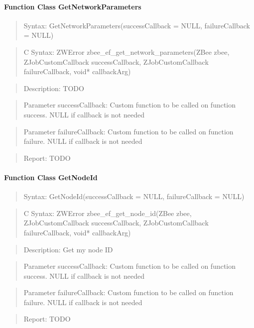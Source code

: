\paragraph{Function Class GetNetworkParameters}
\begin{quote}Syntax: GetNetworkParameters(successCallback = NULL, failureCallback = NULL)\end{quote}
\begin{quote}C Syntax: ZWError zbee\_ef\_get\_network\_parameters(ZBee zbee, ZJobCustomCallback successCallback, ZJobCustomCallback failureCallback, void* callbackArg)\end{quote}
\begin{quote}Description: TODO\end{quote}
\begin{quote}Parameter successCallback: Custom function to be called on function success. NULL if callback is not needed\end{quote}
\begin{quote}Parameter failureCallback: Custom function to be called on function failure. NULL if callback is not needed\end{quote}
\begin{quote}Report: TODO\end{quote}

\paragraph{Function Class GetNodeId}
\begin{quote}Syntax: GetNodeId(successCallback = NULL, failureCallback = NULL)\end{quote}
\begin{quote}C Syntax: ZWError zbee\_ef\_get\_node\_id(ZBee zbee, ZJobCustomCallback successCallback, ZJobCustomCallback failureCallback, void* callbackArg)\end{quote}
\begin{quote}Description: Get my node ID\end{quote}
\begin{quote}Parameter successCallback: Custom function to be called on function success. NULL if callback is not needed\end{quote}
\begin{quote}Parameter failureCallback: Custom function to be called on function failure. NULL if callback is not needed\end{quote}
\begin{quote}Report: TODO\end{quote}


